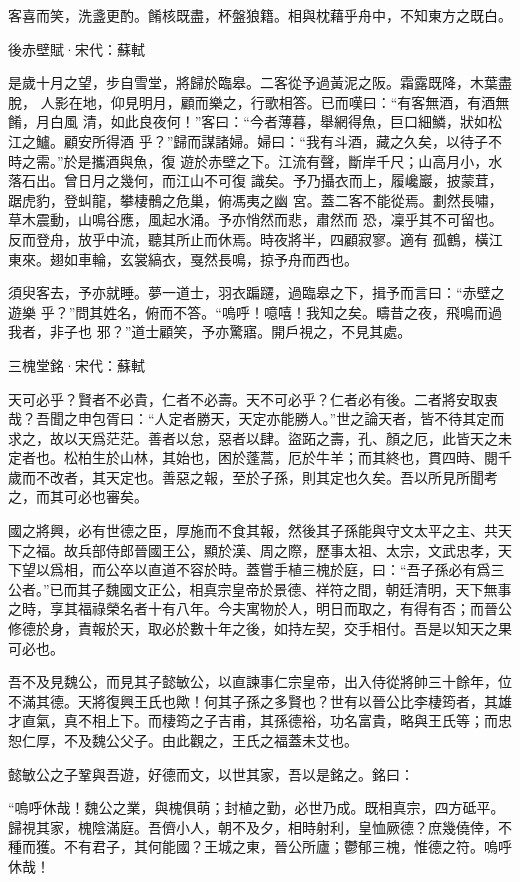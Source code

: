\documentclass[12pt,a4paper]{ctexbook}
\begin{document}
客喜而笑，洗盞更酌。餚核既盡，杯盤狼籍。相與枕藉乎舟中，不知東方之既白。\par
後赤壁賦·宋代：蘇軾 \par
是歲十月之望，步自雪堂，將歸於臨皋。二客從予過黃泥之阪。霜露既降，木葉盡脫， 人影在地，仰見明月，顧而樂之，行歌相答。已而嘆曰：“有客無酒，有酒無餚，月白風 清，如此良夜何！”客曰：“今者薄暮，舉網得魚，巨口細鱗，狀如松江之鱸。顧安所得酒 乎？”歸而謀諸婦。婦曰：“我有斗酒，藏之久矣，以待子不時之需。”於是攜酒與魚，復 遊於赤壁之下。江流有聲，斷岸千尺；山高月小，水落石出。曾日月之幾何，而江山不可復 識矣。予乃攝衣而上，履巉巖，披蒙茸，踞虎豹，登虯龍，攀棲鶻之危巢，俯馮夷之幽 宮。蓋二客不能從焉。劃然長嘯，草木震動，山鳴谷應，風起水涌。予亦悄然而悲，肅然而 恐，凜乎其不可留也。反而登舟，放乎中流，聽其所止而休焉。時夜將半，四顧寂寥。適有 孤鶴，橫江東來。翅如車輪，玄裳縞衣，戛然長鳴，掠予舟而西也。\par
須臾客去，予亦就睡。夢一道士，羽衣蹁躚，過臨皋之下，揖予而言曰：“赤壁之遊樂 乎？”問其姓名，俯而不答。“嗚呼！噫嘻！我知之矣。疇昔之夜，飛鳴而過我者，非子也 邪？”道士顧笑，予亦驚寤。開戶視之，不見其處。\par
三槐堂銘·宋代：蘇軾 \par
天可必乎？賢者不必貴，仁者不必壽。天不可必乎？仁者必有後。二者將安取衷哉？吾聞之申包胥曰：“人定者勝天，天定亦能勝人。”世之論天者，皆不待其定而求之，故以天爲茫茫。善者以怠，惡者以肆。盜跖之壽，孔、顏之厄，此皆天之未定者也。松柏生於山林，其始也，困於蓬蒿，厄於牛羊；而其終也，貫四時、閱千歲而不改者，其天定也。善惡之報，至於子孫，則其定也久矣。吾以所見所聞考之，而其可必也審矣。\par
國之將興，必有世德之臣，厚施而不食其報，然後其子孫能與守文太平之主、共天下之福。故兵部侍郎晉國王公，顯於漢、周之際，歷事太祖、太宗，文武忠孝，天下望以爲相，而公卒以直道不容於時。蓋嘗手植三槐於庭，曰：“吾子孫必有爲三公者。”已而其子魏國文正公，相真宗皇帝於景德、祥符之間，朝廷清明，天下無事之時，享其福祿榮名者十有八年。今夫寓物於人，明日而取之，有得有否；而晉公修德於身，責報於天，取必於數十年之後，如持左契，交手相付。吾是以知天之果可必也。\par
吾不及見魏公，而見其子懿敏公，以直諫事仁宗皇帝，出入侍從將帥三十餘年，位不滿其德。天將復興王氏也歟！何其子孫之多賢也？世有以晉公比李棲筠者，其雄才直氣，真不相上下。而棲筠之子吉甫，其孫德裕，功名富貴，略與王氏等；而忠恕仁厚，不及魏公父子。由此觀之，王氏之福蓋未艾也。\par
懿敏公之子鞏與吾遊，好德而文，以世其家，吾以是銘之。銘曰：\par
“嗚呼休哉！魏公之業，與槐俱萌；封植之勤，必世乃成。既相真宗，四方砥平。歸視其家，槐陰滿庭。吾儕小人，朝不及夕，相時射利，皇恤厥德？庶幾僥倖，不種而獲。不有君子，其何能國？王城之東，晉公所廬；鬱郁三槐，惟德之符。嗚呼休哉！\par
\end{document}

